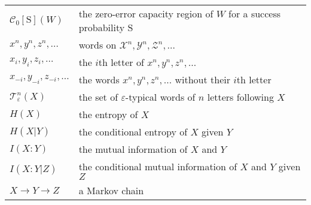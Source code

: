 \begin{longtable}{ll}
  $\mathcal{C}_0[\mathrm{S}](W)$ & the zero-error capacity region of $W$ for a success probability $\mathrm{S}$\\
  $x^n,y^n,z^n,\ldots$ & words on $\mathcal{X}^n,\mathcal{Y}^n,\mathcal{Z}^n,\ldots$\\
  $x_i,y_i,z_i,\ldots$ & the $i$th letter of $x^n,y^n,z^n,\ldots$\\
  $x_{-i},y_{-i},z_{-i},\ldots$ & the words $x^n,y^n,z^n,\ldots$ without their $i$th letter\\
  $\mathcal{T}^n_{\varepsilon}(X)$ & the set of $\varepsilon$-typical words of $n$ letters following $X$\\
  $H(X)$ & the entropy of $X$\\
  $H(X|Y)$ & the conditional entropy of $X$ given $Y$\\
  $I(X:Y)$ & the mutual information of $X$ and $Y$\\
  $I(X:Y|Z)$ & the conditional mutual information of $X$ and $Y$ given $Z$\\
  $X \rightarrow Y \rightarrow Z$ & a Markov chain\\ 
\end{longtable}
